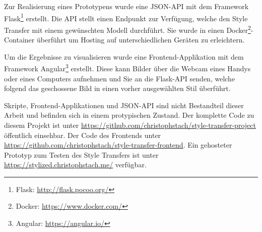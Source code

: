 Zur Realisierung eines Prototypens wurde eine JSON-API mit dem Framework Flask\footnote{Flask: \url{http://flask.pocoo.org/}} erstellt. Die API stellt einen Endpunkt zur Verfügung, welche den Style Transfer mit einem gewünschten Modell durchführt. Sie wurde in einen Docker\footnote{Docker: \url{https://www.docker.com/}}-Container überführt um Hosting auf unterschiedlichen Geräten zu erleichtern.

Um die Ergebnisse zu visualisieren wurde eine Frontend-Applikation mit dem Framework Angular\footnote{Angular: \url{https://angular.io/}} erstellt. Diese kann Bilder über die Webcam eines Handys oder eines Computers aufnehmen und Sie an die Flask-API senden, welche folgend das geschossene Bild in einen vorher ausgewählten Stil überführt.

Skripte, Frontend-Applikationen und JSON-API sind nicht Bestandteil dieser Arbeit und befinden sich in einem protypischen Zustand. Der komplette Code zu diesem Projekt ist unter \url{https://github.com/christophstach/style-transfer-project} öffentlich einsehbar. Der Code des Frontends unter \url{https://github.com/christophstach/style-transfer-frontend}. Ein gehosteter Prototyp zum Testen des Style Transfers ist unter \url{https://stylized.christophstach.me/} verfügbar.